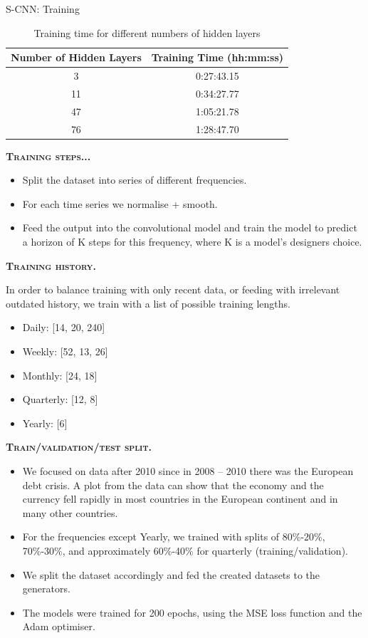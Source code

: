 \documentclass[aspectratio=169, 12pt]{beamer}
\begin{document}
\begin{frame}[allowframebreaks]{S-CNN: Training}
\begin{table}[htbp]
\centering
\caption{Training time for different numbers of hidden layers}
\begin{tabular}{cc}
\toprule
Number of Hidden Layers & Training Time (hh:mm:ss) \\
\midrule
3 & 0:27:43.15 \\
11 & 0:34:27.77 \\
47 & 1:05:21.78 \\
76 & 1:28:47.70 \\
\bottomrule
\end{tabular}
\end{table}
\begin{center}
    \textsc{\textbf{Training steps...}}
\end{center}
\begin{itemize}
\item Split the dataset into series of different frequencies.
\item For each time series we normalise + smooth.
\item Feed the output into the convolutional model and train the model to predict a horizon of K steps for this frequency, where K is a model’s designers choice.
\end{itemize}
\newpage
\begin{center}
    \textsc{\textbf{Training history.}}
\end{center}
In order to balance training with only recent data, or feeding with irrelevant outdated history, we train with a list of possible training lengths.
\begin{itemize}
    \item Daily: [14, 20, 240]
    \item Weekly: [52, 13, 26]
    \item Monthly: [24, 18]
    \item Quarterly: [12, 8]
    \item Yearly: [6]
\end{itemize}
\newpage
\begin{center}
    \textsc{\textbf{Train/validation/test split.}}
\end{center}
\begin{itemize}
    \item We focused on data after 2010 since in 2008 – 2010 there was the European debt crisis. A plot from the data can show that the economy and the currency fell rapidly in most countries in the European continent and in many other countries.
    \item For the frequencies except Yearly, we trained with splits of 80\%-20\%, 70\%-30\%, and approximately 60\%-40\% for quarterly (training/validation).
    \item We split the dataset accordingly and fed the created datasets to the generators.
    \item The models were trained for 200 epochs, using the MSE loss function and the Adam optimiser.
\end{itemize}

\end{frame}
\end{document}
